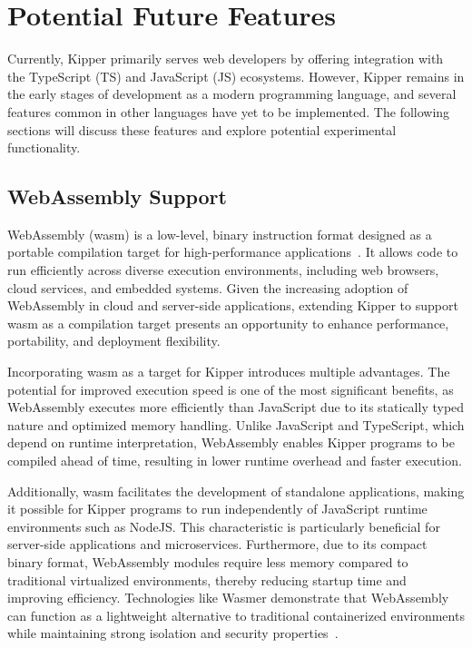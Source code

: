 \section{Potential Future Features}

Currently, Kipper primarily serves web developers by offering integration with the TypeScript (TS) and JavaScript (JS) ecosystems. However, Kipper remains in the early stages of development as a modern programming language, and several features common in other languages have yet to be implemented. The following sections will discuss these features and explore potential experimental functionality.

\subsection{WebAssembly Support}

WebAssembly (\acrshort{wasm}) is a low-level, binary instruction format designed as a portable compilation target for high-performance applications~\cite{webassembly}. It allows code to run efficiently across diverse execution environments, including web browsers, cloud services, and embedded systems. Given the increasing adoption of WebAssembly in cloud and server-side applications, extending Kipper to support \acrshort{wasm} as a compilation target presents an opportunity to enhance performance, portability, and deployment flexibility.

Incorporating \acrshort{wasm} as a target for Kipper introduces multiple advantages. The potential for improved execution speed is one of the most significant benefits, as WebAssembly executes more efficiently than JavaScript due to its statically typed nature and optimized memory handling. Unlike JavaScript and TypeScript, which depend on runtime interpretation, WebAssembly enables Kipper programs to be compiled ahead of time, resulting in lower runtime overhead and faster execution.

Additionally, \acrshort{wasm} facilitates the development of standalone applications, making it possible for Kipper programs to run independently of JavaScript runtime environments such as NodeJS. This characteristic is particularly beneficial for server-side applications and microservices. Furthermore, due to its compact binary format, WebAssembly modules require less memory compared to traditional virtualized environments, thereby reducing startup time and improving efficiency. Technologies like Wasmer demonstrate that WebAssembly can function as a lightweight alternative to traditional containerized environments while maintaining strong isolation and security properties~\cite{wasmer}.

